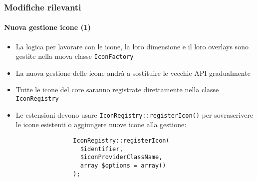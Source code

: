 \begin{frame}[fragile]
	\frametitle{Modifiche rilevanti}
	\framesubtitle{Nuova gestione icone (1)}

	\lstset{basicstyle=\smaller\ttfamily}

	\begin{itemize}

		\item La logica per lavorare con le icone, la loro dimensione e il loro overlays sono gestite
			nella nuova classe \texttt{IconFactory}

		\item La nuova gestione delle icone andrà a sostituire le vecchie API gradualmente

		\item Tutte le icone del core saranno registrate direttamente nella classe \texttt{IconRegistry} 

		\item Le estensioni devono usare \texttt{IconRegistry::registerIcon()} per sovrascrivere le icone
			esistenti o aggiungere nuove icone alla gestione:

			\begin{lstlisting}
				IconRegistry::registerIcon(
				  $identifier,
				  $iconProviderClassName,
				  array $options = array()
				);
			\end{lstlisting}

	\end{itemize}

\end{frame}


